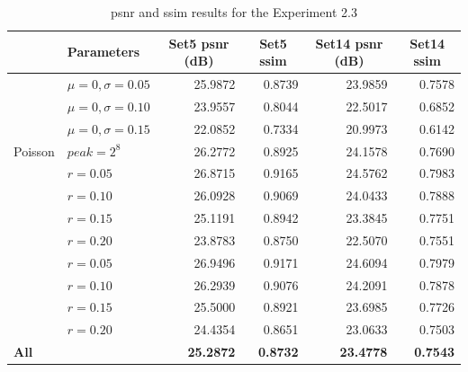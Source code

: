\begin{table}[]
	\centering
	\begin{tabular}{|l|l|r|r|r|r|}
		\hline
		\rowcolor[HTML]{EFEFEF} 
		\multicolumn{1}{|c|}{\cellcolor[HTML]{EFEFEF}\textbf{Noise}} & \textbf{Parameters} & \multicolumn{1}{c|}{\cellcolor[HTML]{EFEFEF}\textbf{Set5 \gls{psnr} (dB)}} & \multicolumn{1}{c|}{\cellcolor[HTML]{EFEFEF}\textbf{Set5 \gls{ssim}}} & \multicolumn{1}{c|}{\cellcolor[HTML]{EFEFEF}\textbf{Set14 \gls{psnr} (dB)}} & \multicolumn{1}{c|}{\cellcolor[HTML]{EFEFEF}\textbf{Set14 \gls{ssim}}} \\ \hline
		\rowcolor[HTML]{FFFFFF} 
		\cellcolor[HTML]{EFEFEF} & $\mu=0, \sigma=0.05$ & 25.9872 & 0.8739 & 23.9859 & 0.7578 \\
		\rowcolor[HTML]{EFEFEF} 
		\cellcolor[HTML]{EFEFEF} & $\mu=0, \sigma=0.10$ & 23.9557 & 0.8044 & 22.5017 & 0.6852 \\
		\rowcolor[HTML]{FFFFFF} 
		\multirow{-3}{*}{\cellcolor[HTML]{EFEFEF}Gaussian} & $\mu=0, \sigma=0.15$ & 22.0852 & 0.7334 & 20.9973 & 0.6142 \\
		\rowcolor[HTML]{EFEFEF} 
		Poisson & $peak=2^8$ & 26.2772 & 0.8925 & 24.1578 & 0.7690 \\
		\rowcolor[HTML]{FFFFFF} 
		\cellcolor[HTML]{EFEFEF} & $r=0.05$ & 26.8715 & 0.9165 & 24.5762 & 0.7983 \\
		\rowcolor[HTML]{EFEFEF} 
		\cellcolor[HTML]{EFEFEF} & $r=0.10$ & 26.0928 & 0.9069 & 24.0433 & 0.7888 \\
		\rowcolor[HTML]{FFFFFF} 
		\cellcolor[HTML]{EFEFEF} & $r=0.15$ & 25.1191 & 0.8942 & 23.3845 & 0.7751 \\
		\rowcolor[HTML]{EFEFEF} 
		\multirow{-4}{*}{\cellcolor[HTML]{EFEFEF}Salt-and-pepper} & $r=0.20$ & 23.8783 & 0.8750 & 22.5070 & 0.7551 \\
		\rowcolor[HTML]{FFFFFF} 
		\cellcolor[HTML]{EFEFEF} & $r=0.05$ & 26.9496 & 0.9171 & 24.6094 & 0.7979 \\
		\rowcolor[HTML]{EFEFEF} 
		\cellcolor[HTML]{EFEFEF} & $r=0.10$ & 26.2939 & 0.9076 & 24.2091 & 0.7878 \\
		\rowcolor[HTML]{FFFFFF} 
		\cellcolor[HTML]{EFEFEF} & $r=0.15$ & 25.5000 & 0.8921 & 23.6985 & 0.7726 \\
		\rowcolor[HTML]{EFEFEF} 
		\multirow{-4}{*}{\cellcolor[HTML]{EFEFEF}Uniform} & $r=0.20$ & 24.4354 & 0.8651 & 23.0633 & 0.7503 \\
		\rowcolor[HTML]{FFFFFF} 
		\textbf{All} &  & \textbf{25.2872} & \textbf{0.8732} & \textbf{23.4778} & \textbf{0.7543}\\\hline
	\end{tabular}
	\caption{\gls{psnr} and \gls{ssim} results for the Experiment 2.3}
	\label{tab:experiment23}
\end{table}

